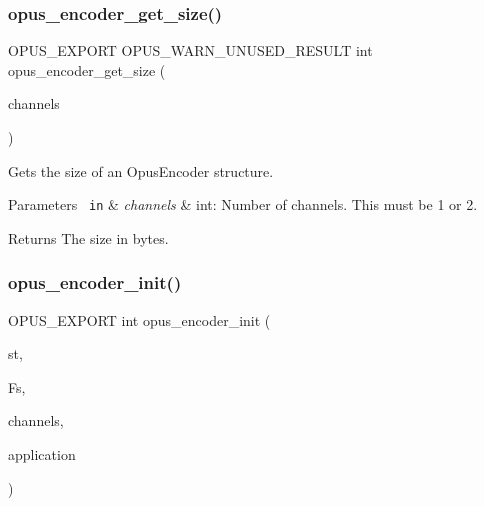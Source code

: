 \subsubsection{\texorpdfstring{opus\_encoder\_get\_size()}{opus\_encoder\_get\_size()}}
{\footnotesize\ttfamily O\+P\+U\+S\+\_\+\+E\+X\+P\+O\+RT O\+P\+U\+S\+\_\+\+W\+A\+R\+N\+\_\+\+U\+N\+U\+S\+E\+D\+\_\+\+R\+E\+S\+U\+LT int opus\+\_\+encoder\+\_\+get\+\_\+size (\begin{DoxyParamCaption}\item[{int}]{channels }\end{DoxyParamCaption})}

Gets the size of an {\ttfamily Opus\+Encoder} structure. 
\begin{DoxyParams}[1]{Parameters}
\mbox{\texttt{ in}}  & {\em channels} & {\ttfamily int}\+: Number of channels. This must be 1 or 2. \\
\hline
\end{DoxyParams}
\begin{DoxyReturn}{Returns}
The size in bytes. 
\end{DoxyReturn}
\mbox{\label{group__opus__encoder_ga363e90db0f434b2d8fde7dcf989270b1}} 
\subsubsection{\texorpdfstring{opus\_encoder\_init()}{opus\_encoder\_init()}}
{\footnotesize\ttfamily O\+P\+U\+S\+\_\+\+E\+X\+P\+O\+RT int opus\+\_\+encoder\+\_\+init (\begin{DoxyParamCaption}\item[{\mbox{\hyperlink{group__opus__encoder_gaf461a3ef2f10c2fe8b994a176f06c9bd}{Opus\+Encoder}} $\ast$}]{st,  }\item[{\mbox{\hyperlink{opus__types_8h_aa4d309d6f80b99dbabebc8f98879ab9a}{opus\+\_\+int32}}}]{Fs,  }\item[{int}]{channels,  }\item[{int}]{application }\end{DoxyParamCaption})}

